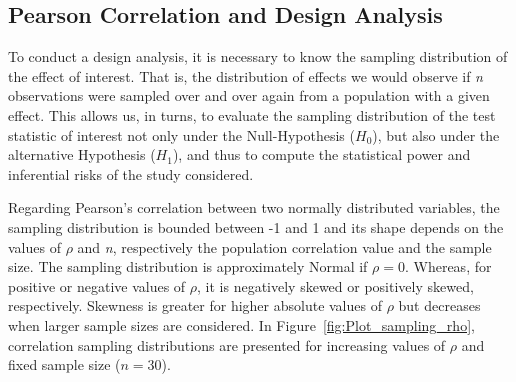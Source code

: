 \documentclass{article}\usepackage[]{graphicx}\usepackage[]{color}
\newcommand{\setappendix}{Appendix~\thesection:~}
\begin{document}
{}
\printbibliography
%

\clearpage

\appendix
\titleformat{\section}{\normalfont\Large\bfseries}{\setappendix}{0em}{}
\renewcommand\thefigure{\thesection.\arabic{figure}}
\renewcommand\theequation{\thesection.\arabic{equation}}
\begin{refsection}

\section{Pearson Correlation and Design Analysis}\label{sec:appendix_a}
\setcounter{figure}{0}
\setcounter{equation}{0}
\setcounter{footnote}{0}

To conduct a design analysis, it is necessary to know the sampling distribution of the effect of interest. That is, the distribution of effects we would observe if \emph{n} observations were sampled over and over again from a population with a given effect. This allows us, in turns, to evaluate the sampling distribution of the test statistic of interest not only under the Null-Hypothesis ($H_0$), but also under the alternative Hypothesis ($H_1$), and  thus to compute the statistical power and inferential risks of the study considered.

Regarding Pearson's correlation between two normally distributed variables, the sampling distribution is bounded between -1 and 1 and its shape depends on the values of $\rho$ and \emph{n}, respectively the population correlation value and the sample size. The sampling distribution is approximately Normal if $\rho = 0$. Whereas, for positive or negative values of $\rho$, it is negatively skewed or positively skewed, respectively. Skewness is greater for higher absolute values of $\rho$ but decreases when larger sample sizes are considered. In Figure~\ref{fig:Plot_sampling_rho}, correlation sampling distributions are presented for increasing values of $\rho$ and fixed sample size ($n = 30$).






\end{refsection}
\end{document}
